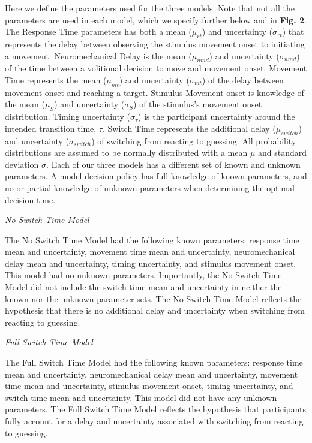 \documentclass[12pt]{article}
\newcommand\boldblue[1]{\textcolor{mydarkblue}{\textbf{#1}}}
\begin{document}
\noindent Here we define the parameters used for the three models. Note that not all the parameters are used in each model, which we specify further below and in \boldblue{Fig. 2}. The Response Time parameters has both a mean ($\mu_{rt}$) and uncertainty ($\sigma_{rt}$) that represents the delay between observing the stimulus movement onset to initiating a movement. Neuromechanical Delay is the mean ($\mu_{nmd}$) and uncertainty ($\sigma_{nmd}$) of the time between a volitional decision to move and movement onset. Movement Time represents the mean ($\mu_{mt}$) and uncertainty ($\sigma_{mt}$) of the delay between movement onset and reaching a target. Stimulus Movement onset is knowledge of the mean ($\mu_{S}$) and uncertainty ($\sigma_{S}$) of the stimulus’s movement onset distribution. Timing uncertainty ($\sigma_{\tau}$) is the participant uncertainty around the intended transition time, $\tau$. Switch Time represents the additional delay ($\mu_{switch}$) and uncertainty  ($\sigma_{switch}$) of switching from reacting to guessing. All probability distributions are assumed to be normally distributed with a mean $\mu$ and standard deviation $\sigma$.  Each of our three models has a different set of known and unknown parameters. A model decision policy has full knowledge of known parameters, and no or partial knowledge of unknown parameters when determining the optimal decision time.

\vspace{2mm}
\noindent \emph{No Switch Time Model}

\noindent The No Switch Time Model had the following known parameters: response time mean and uncertainty, movement time mean and uncertainty, neuromechanical delay mean and uncertainty, timing uncertainty, and stimulus movement onset. This model had no unknown parameters. Importantly, the No Switch Time Model did not include the switch time mean and uncertainty in neither the known nor the unknown parameter sets. The No Switch Time Model reflects the hypothesis that there is no additional delay and uncertainty when switching from reacting to guessing.

\vspace*{2mm}
\noindent \emph{Full Switch Time Model}

\noindent The Full Switch Time Model had the following known parameters: response time mean and uncertainty, neuromechanical delay mean and uncertainty, movement time mean and uncertainty, stimulus movement onset, timing uncertainty, and switch time mean and uncertainty. This model did not have any unknown parameters. The Full Switch Time Model reflects the hypothesis that participants fully account for a delay and uncertainty associated with switching from reacting to guessing.
\end{document}
